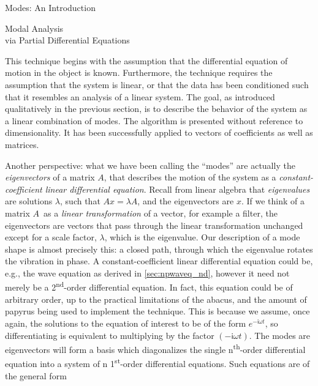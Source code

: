 \documentclass[a4paper,10pt]{report}
\numberwithin{equation}{section}
\begin{document}
{\begin{chapter}
\begin{section}{Modes: An Introduction}
\end{section}
\par
\begin{section}{Modal Analysis \\via Partial Differential Equations}
\par
This technique begins with the assumption that the differential equation of motion in the object is known. Furthermore, the technique requires the assumption that the system is linear, or that the data has been conditioned such that it resembles an analysis of a linear system. The goal, as introduced qualitatively in the previous section, is to describe the behavior of the system as a linear combination of modes. The algorithm is presented without reference to dimensionality. It has been successfully applied to vectors of coefficients as well as matrices. \cite[p.~317]{Strang2009}
\par
Another perspective: what we have been calling the ``modes'' are actually the \emph{eigenvectors} of a matrix $A$, that describes the motion of the system as a \emph{constant-coefficient linear differential equation}. Recall from linear algebra that \emph{eigenvalues} are solutions $\lambda$, such that $Ax = \lambda A$, and the eigenvectors are $x$.\cite[p.~283]{Strang2009} If we think of a matrix $A$\  as a \emph{linear transformation} of a vector, for example a filter, the eigenvectors are vectors that pass through the linear transformation unchanged except for a scale factor, $\lambda$, which is the eigenvalue. Our description of a mode shape is almost precisely this: a closed path, through which the eigenvalue rotates the vibration in phase. \cite[p.~8]{Marshall2004} A constant-coefficient linear differential equation could be, e.g., the wave equation as derived in \ref{sec:npwaveq_nd}, however it need not merely be a 2\textsuperscript{nd}-order differential equation. In fact, this equation could be of 
arbitrary order, up to the practical limitations of the abacus, and the amount of papyrus being used to implement the technique. This is because we assume, once again, the solutions to the equation of interest to be of the form $e^{-\mathsf{i}\omega t}$, so differentiating is equivalent to multiplying by the factor $(-\mathsf{i}\omega t)$. The modes are eigenvectors will form a basis which diagonalizes the single n\textsuperscript{th}-order differential equation into a system of n 1\textsuperscript{st}-order differential equations. Such equations are of the general form\cite[p.~16]{Reid1992}
\begin{equation}

\end{equation}
\end{section}
\end{chapter}}
\end{document}
